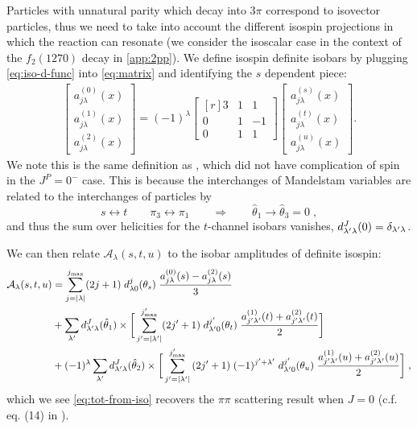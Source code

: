 Particles with unnatural parity which decay into \(3\pi\) correspond to isovector particles, thus we need to take into account the different isospin projections in which the reaction can resonate (we consider the isoscalar case in the context of the \(f_2(1270)\) decay in \cref{app:2pp}).
We define isospin definite isobars by plugging \cref{eq:iso-d-func} into \cref{eq:matrix} and identifying the \(s\) dependent piece:
\begin{align}
  \begin{bmatrix}
  a^{(0)}_{j\lambda}(x) \\ a^{(1)}_{j\lambda}(x) \\ a^{(2)}_{j\lambda}(x)
  \end{bmatrix}
=
  (-1)^\lambda
  \begin{bmatrix*}[r]
    3 & 1 & 1 \\ 	0 & 1 & -1 \\ 0 & 1 & 1
  \end{bmatrix*}
  \begin{bmatrix}
  a^{(s)}_{j\lambda}(x) \\ a^{(t)}_{j\lambda}(x) \\ a^{(u)}_{j\lambda}(x)
  \end{bmatrix}.
\end{align}
We note this is the same definition as \cite{Albaladejo2018}, which did not have complication of spin in the \(J^P = 0^-\) case. This is because the interchanges of Mandelstam variables are related to the interchanges of particles by
  \begin{equation}
    \label{frame-change}
    s\leftrightarrow  t  \qquad \pi_3 \leftrightarrow \pi_1 \qquad \Rightarrow \qquad \hat{\theta}_1 \to \hat{\theta}_3 = 0 \; ,
  \end{equation}
and thus the sum over helicities for the \(t\)-channel isobars vanishes, \(d_{{\lambda^\prime} \lambda}^J(0) = \delta_{{\lambda^\prime}\lambda} \).

We can then relate \(\mathcal{A}_\lambda(s,t,u)\) to the isobar amplitudes of definite isospin:
  \begin{align}
    \label{eq:tot-from-iso}
    \mathcal{A}_\lambda(s,t,u) &= \sum_{j = |\lambda|}^{{j_\text{max}}} (2 j+1) \; d_{\lambda0}^j(\theta_s) \;
     \frac{a_{j \lambda}^{(0)}(s) - a_{j \lambda}^{(2)}(s)}{3}
     \nonumber \\
    &+ \sum_{\lambda^\prime}  d_{{\lambda^\prime} \lambda}^J(\hat{\theta}_1) \times
    \bigg[
    \sum_{{j^\prime} =  |{\lambda^\prime}|}^{{j^\prime_\text{max}}} (2{j^\prime}+1) \; d_{{\lambda^\prime}0}^{j^\prime}(\theta_t) \;
    \frac{a_{{j^\prime} {\lambda^\prime}}^{(1)}(t) + a_{{j^\prime} {\lambda^\prime}}^{(2)}(t)}{2}
    \bigg] \\
   &+ (-1)^\lambda \sum_{{\lambda^\prime}}  d^{J}_{{\lambda^\prime}\lambda }(\hat{\theta}_2)
   \times
   \bigg[
   \sum_{{j^\prime} =  |{\lambda^\prime}|}^{{j^\prime_\text{max}}} \, (2{j^\prime}+1) \; (-1)^{{j^\prime} + {\lambda^\prime}}
     \;d_{{\lambda^\prime}0}^{j^\prime}(\theta_u) \;
     \frac{a_{{j^\prime} {\lambda^\prime}}^{(1)}(u) + a_{{j^\prime} {\lambda^\prime}}^{(2)}(u)}{2}
   \bigg] \; ,
   \nonumber
   \end{align}
which we see \cref{eq:tot-from-iso} recovers the \(\pi\pi\) scattering result when \(J = 0\) (c.f. eq. (14) in \cite{Albaladejo2018}).


